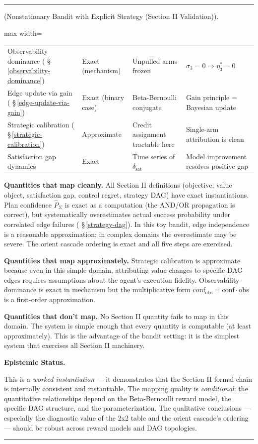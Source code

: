\documentclass[11pt,oneside]{article}
\newcounter{claim}[section]
\renewcommand{\theclaim}{\thesection.\arabic{claim}}
\newenvironment{segment}[2]{%
  \refstepcounter{claim}%
  \bigskip\noindent\hrule\smallskip
  \noindent{\bfseries #1~\theclaim}\enskip(#2).\par\smallskip
  \noindent\ignorespaces
}{%
  \par\smallskip\noindent\hrule\bigskip
}
\newenvironment{remark}[1][]{\begin{segment}{Remark}{#1}}{\end{segment}}
\begin{document}
\begin{remark}[Nonstationary Bandit with Explicit Strategy (Section II Validation)]
\begin{adjustbox}{max width=\textwidth}
\begin{tabular}{llll}
Observability dominance ( \S\,\ref{observability-dominance}) & Exact (mechanism) & Unpulled arms frozen & $\sigma_3 = 0 \Rightarrow \eta_3^* = 0$ \\
Edge update via gain ( \S\,\ref{edge-update-via-gain}) & Exact (binary case) & Beta-Bernoulli conjugate & Gain principle = Bayesian update \\
Strategic calibration ( \S\,\ref{strategic-calibration}) & Approximate & Credit assignment tractable here & Single-arm attribution is clean \\
Satisfaction gap dynamics & Exact & Time series of $\delta_\text{sat}$ & Model improvement resolves positive gap \\
\bottomrule
\end{tabular}
\end{adjustbox}


\textbf{Quantities that map cleanly.} All Section II definitions (objective, value object, satisfaction gap, control regret, strategy DAG) have exact instantiations. Plan confidence $\hat P_\Sigma$ is exact as a computation (the AND/OR propagation is correct), but systematically overestimates actual success probability under correlated edge failures ( \S\,\ref{strategy-dag}). In this toy bandit, edge independence is a reasonable approximation; in complex domains the overestimate may be severe. The orient cascade ordering is exact and all five steps are exercised.

\textbf{Quantities that map approximately.} Strategic calibration is approximate because even in this simple domain, attributing value changes to specific DAG edges requires assumptions about the agent's execution fidelity. Observability dominance is exact in mechanism but the multiplicative form $\text{conf}_\text{obs} = \text{conf} \cdot \text{obs}$ is a first-order approximation.

\textbf{Quantities that don't map.} No Section II quantity fails to map in this domain. The system is simple enough that every quantity is computable (at least approximately). This is the advantage of the bandit setting: it is the simplest system that exercises all Section II machinery.


\medskip\noindent\textbf{Epistemic Status.}


This is a \textit{worked instantiation} — it demonstrates that the Section II formal chain is internally consistent and instantiable. The mapping quality is \textit{conditional}: the quantitative relationships depend on the Beta-Bernoulli reward model, the specific DAG structure, and the parameterization. The qualitative conclusions — especially the diagnostic value of the 2x2 table and the orient cascade's ordering — should be robust across reward models and DAG topologies.


\end{remark}
\end{document}
